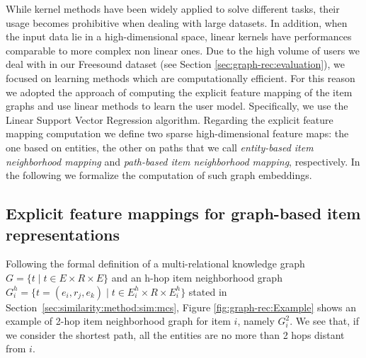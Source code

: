 While kernel methods have been widely applied to solve different tasks, their usage becomes prohibitive when dealing with large datasets. 
In addition, when the input data lie in a high-dimensional space, linear kernels have performances comparable to more complex non linear ones. 
Due to the high volume of users we deal with in our Freesound dataset (see Section \ref{sec:graph-rec:evaluation}), we focused on learning methods which are computationally efficient. For this reason we adopted the approach of computing the explicit feature mapping of the item graphs and use linear methods to learn the user model. Specifically, we use the Linear Support Vector Regression \citep{HoL12} algorithm. 
Regarding the explicit feature mapping computation we define two sparse high-dimensional feature maps: the one based on entities, the other on paths that we call \textit{entity-based item neighborhood mapping} and \textit{path-based item neighborhood mapping}, respectively. In the following we formalize the computation of such graph embeddings.

\subsection{Explicit feature mappings for graph-based item representations}

Following the formal definition of a multi-relational knowledge graph $G=\lbrace t \mid t \in E \times R \times E \rbrace$ and an h-hop item neighborhood graph $G^h_i=\lbrace t=(e_i,r_j,e_k) \mid t \in E^h_i \times R \times E^h_i \rbrace$ stated in Section~\ref{sec:similarity:method:sim:mcs}, Figure \ref{fig:graph-rec:Example} shows an example of 2-hop item neighborhood graph for item $i$, namely $G^2_i$. We see that, if we consider the shortest path, all the entities are no more than 2 hops distant from $i$. 

